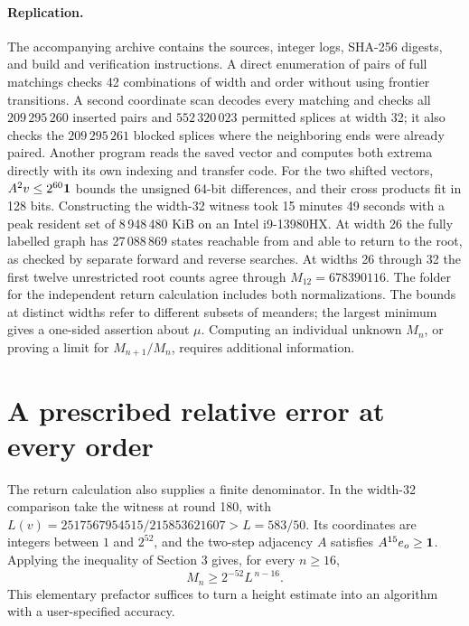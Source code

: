 \documentclass[11pt]{article}
\begin{document}
\paragraph{Replication.}
The accompanying archive contains the sources, integer logs, SHA-256 digests, and build and verification instructions. A direct enumeration of pairs of full matchings checks 42 combinations of width and order without using frontier transitions. A second coordinate scan decodes every matching and checks all \(209\,295\,260\) inserted pairs and \(552\,320\,023\) permitted splices at width 32; it also checks the \(209\,295\,261\) blocked splices where the neighboring ends were already paired. Another program reads the saved vector and computes both extrema directly with its own indexing and transfer code. For the two shifted vectors, \(A^2v\le 2^{60}{\bf1}\) bounds the unsigned 64-bit differences, and their cross products fit in 128 bits. Constructing the width-32 witness took 15 minutes 49 seconds with a peak resident set of 8\,948\,480 KiB on an Intel i9-13980HX. At width 26 the fully labelled graph has 27\,088\,869 states reachable from and able to return to the root, as checked by separate forward and reverse searches. At widths 26 through 32 the first twelve unrestricted root counts agree through \(M_{12}=678390116\). The folder for the independent return calculation includes both normalizations. The bounds at distinct widths refer to different subsets of meanders; the largest minimum gives a one-sided assertion about \(\mu\). Computing an individual unknown \(M_n\), or proving a limit for \(M_{n+1}/M_n\), requires additional information.

\newpage
\section{A prescribed relative error at every order}
The return calculation also supplies a finite denominator. In the width-32 comparison take the witness at round 180, with \(L(v)=2517567954515/215853621607>L=583/50\). Its coordinates are integers between \(1\) and \(2^{52}\), and the two-step adjacency \(A\) satisfies \(A^{15}e_o\ge{\bf1}\). Applying the inequality of Section 3 gives, for every \(n\ge16\),
\[
                 M_n\ge 2^{-52} L^{\,n-16}.
\]
This elementary prefactor suffices to turn a height estimate into an algorithm with a user-specified accuracy.
\end{document}

